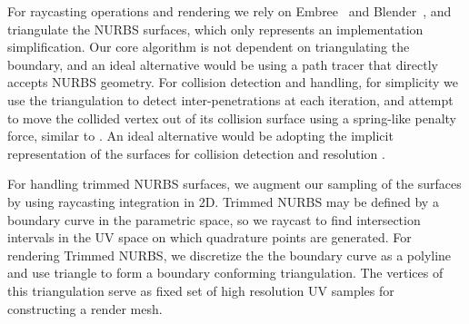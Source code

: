 For raycasting operations and rendering we rely on Embree~\cite{10.1145/2601097.2601199} and Blender~\cite{blender}, and triangulate the NURBS surfaces, which only represents an implementation simplification. 
Our core algorithm is not dependent on triangulating the boundary, and an ideal alternative would be using a path tracer that directly accepts NURBS geometry.
For collision detection and handling, for simplicity we use the triangulation to detect inter-penetrations at each iteration, and attempt to move the collided vertex out of its collision surface using a spring-like penalty force, similar to \cite{10.1145/3355089.3356486, 10.1145/2010324.1964932}.
An ideal alternative would be adopting the implicit representation of the surfaces for collision detection and resolution \cite{10.1145/1516522.1516523, 10.1145/3306346.3323010}. 

For handling trimmed NURBS surfaces, we augment our sampling of the surfaces by using raycasting integration in 2D. Trimmed NURBS may be defined by a boundary curve in the parametric space, so we raycast to find intersection intervals in the UV space on which quadrature points are generated. For rendering Trimmed NURBS, we discretize the the boundary curve as a polyline and use triangle \cite{shewchuk96b, SHEWCHUK200221} to form a boundary conforming triangulation. The vertices of this triangulation serve as fixed set of high resolution UV samples for constructing a render mesh.


